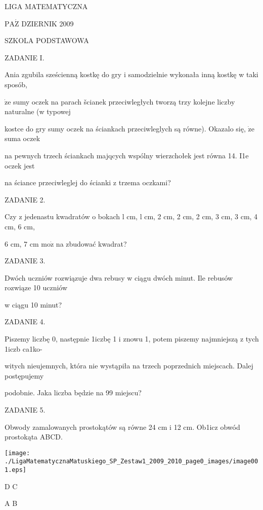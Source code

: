 \documentclass[a4paper,12pt]{article}
\begin{document}
LIGA MATEMATYCZNA

$\mathrm{P}\mathrm{A}\acute{\mathrm{Z}}$ DZIERNIK 2009

SZKOLA PODSTAWOWA

ZADANIE I.

Ania zgubila sześcienną kostkę do gry i samodzielnie wykonała inną kostkę w taki sposób,

$\dot{\mathrm{z}}\mathrm{e}$ sumy oczek na parach šcianek przeciwległych tworzą trzy kolejne liczby naturalne (w typowej

kostce do gry sumy oczek na ściankach przeciwleglych są równe). Okazalo się, $\dot{\mathrm{z}}\mathrm{e}$ suma oczek

na pewnych trzech ściankach majqcych wspólny wierzchołek jest równa 14. I1e oczek jest

na ściance przeciwleglej do ścianki z trzema oczkami?

ZADANIE 2.

Czy z jedenastu kwadratów o bokach l cm, l cm, 2 cm, 2 cm, 2 cm, 3 cm, 3 cm, 4 cm, 6 cm,

6 cm, 7 cm $\mathrm{m}\mathrm{o}\dot{\mathrm{z}}$ na zbudować kwadrat?

ZADANIE 3.

Dwóch uczniów rozwiązuje dwa rebusy w ciągu dwóch minut. Ile rebusów rozwiąze 10 uczniów

w ciągu 10 minut?

ZADANIE 4.

Piszemy liczbę 0, następnie 1iczbę 1 i znowu 1, potem piszemy najmniejszą z tych 1iczb ca1ko-

witych nieujemnych, która nie wystąpiła na trzech poprzednich miejscach. Dalej postępujemy

podobnie. Jaka liczba będzie na 99 miejscu?

ZADANIE 5.

Obwody zamalowanych prostokątów są równe 24 cm i 12 cm. Ob1icz obwód prostokąta ABCD.
\begin{center}
\texttt{[image: ./LigaMatematycznaMatuskiego\_SP\_Zestaw1\_2009\_2010\_page0\_images/image001.eps]}
\end{center}
D  C

A  B
\end{document}

